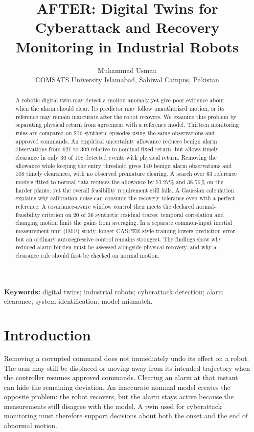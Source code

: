 \documentclass[11pt]{article}
\title{AFTER: Digital Twins for Cyberattack and Recovery Monitoring in Industrial Robots}
\author{Muhammad Usman\\[4pt]\small COMSATS University Islamabad, Sahiwal Campus, Pakistan}
\date{}
\begin{document}
\maketitle
\begin{abstract}
A robotic digital twin may detect a motion anomaly yet give poor evidence about when the alarm should clear. Its predictor may follow unauthorized motion, or its reference may remain inaccurate after the robot recovers. We examine this problem by separating physical return from agreement with a reference model. Thirteen monitoring rules are compared on 216 synthetic episodes using the same observations and approved commands. An empirical uncertainty allowance reduces benign alarm observations from 621 to 309 relative to nominal fixed return, but allows timely clearance in only 36 of 108 detected events with physical return. Removing the allowance while keeping the entry threshold gives 140 benign alarm observations and 108 timely clearances, with no observed premature clearing. A search over 63 reference models fitted to normal data reduces the allowance by 51.27\% and 38.56\% on the harder plants, yet the overall feasibility requirement still fails. A Gaussian calculation explains why calibration noise can consume the recovery tolerance even with a perfect reference. A covariance-aware window control then meets the declared normal-feasibility criterion on 20 of 36 synthetic residual traces; temporal correlation and changing motion limit the gains from averaging. In a separate common-input inertial measurement unit (IMU) study, longer CASPER-style training lowers prediction error, but an ordinary autoregressive control remains strongest. The findings show why reduced alarm burden must be assessed alongside physical recovery, and why a clearance rule should first be checked on normal motion.
\end{abstract}
\noindent\textbf{Keywords:} digital twins; industrial robots; cyberattack detection; alarm clearance; system identification; model mismatch.

\section{Introduction}
Removing a corrupted command does not immediately undo its effect on a robot. The arm may still be displaced or moving away from its intended trajectory when the controller resumes approved commands. Clearing an alarm at that instant can hide the remaining deviation. An inaccurate nominal model creates the opposite problem: the robot recovers, but the alarm stays active because the measurements still disagree with the model. A twin used for cyberattack monitoring must therefore support decisions about both the onset and the end of abnormal motion.
\end{document}

